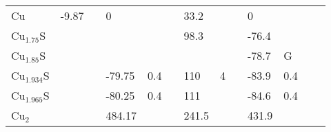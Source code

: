 \documentclass{article}
\begin{document}
\begin{center}
\begin{longtable}{|l|p{2.5cm}|l|p{2.5cm}|l|l|p{2.5cm}|l|l|p{2.5cm}|l|l|l|}
Cu               	   & -9.87                      & \citep{Barin1977} & 0                   &     & \citep{Haynes2013}     & 33.2               &     & \citep{Haynes2013} & 0                                   &     & \citep{Haynes2013} &  \\
Cu$_{1.75}$S           &                            &     &                     &     &         & 98.3               &     & \citep{Puigdomenech2000} & -76.4                               &     & \citep{Puigdomenech2000} &  \\
Cu$_{1.85}$S           &                            &     &                     &     &         &                    &     &     & -78.7                               & G   & \citep{Hiroi1986} &  \\
Cu$_{1.934}$S          &                            &     & -79.75              & 0.4 & \citep{Potter1977}     & 110                & 4   & \citep{Potter1977} & -83.9                               & 0.4 & \citep{Potter1977} &  \\
Cu$_{1.965}$S          &                            &     & -80.25              & 0.4 & \citep{Potter1977}     & 111                &     & \citep{Potter1977} & -84.6                               & 0.4 & \citep{Potter1977} &  \\
Cu$_2$            	   &                            &     & 484.17              &     & \citep{WagmanDonaldD1969}     & 241.5              &     & \citep{WagmanDonaldD1969} & 431.9                              &     & \citep{WagmanDonaldD1969} &  \\


\end{longtable}
\end{center}
\end{document}
